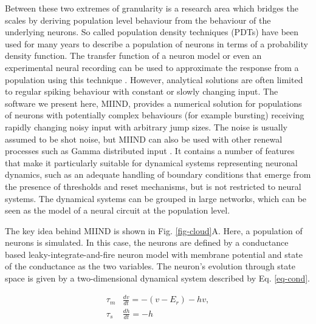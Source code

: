 \documentclass[utf8]{frontiersSCNS} %
\begin{document}
Between these two extremes of granularity is a research area which bridges the scales by deriving population level behaviour from the behaviour of the underlying neurons. So called population density techniques (PDTs) have been used for many years \citep{knight1972dynamics,knight1996dynamical,omurtag2000} to describe a population of neurons in terms of a probability density function. The transfer function of a neuron model or even an experimental neural recording can be used to approximate the response from a population using this technique \citep{wilson1972excitatory,el2009master,carlu2020mean}. However, analytical solutions are often limited to regular spiking behaviour with constant or slowly changing input. The software we present here, MIIND, provides a numerical solution for populations of neurons with potentially complex behaviours (for example bursting) receiving rapidly changing noisy input with arbitrary jump sizes. The noise is usually assumed to be shot noise, but MIIND can also be used with other renewal processes such as Gamma distributed input \citep{lai2017population}. 
It contains a number of features that make it particularly suitable for dynamical systems representing neuronal dynamics, such as an adequate handling of boundary conditions that emerge from the presence of thresholds and reset mechanisms, but is not restricted to neural systems. The dynamical systems can be grouped in large networks, which can be seen as the model of a neural circuit at the population level.

The key idea behind MIIND is shown in Fig. \ref{fig-cloud}A. Here, a population of neurons is simulated. In this case, the neurons are defined by a conductance based leaky-integrate-and-fire neuron model with membrane potential and state of the conductance as the two variables. The neuron's evolution through state space is given by a two-dimensional dynamical system described by Eq. \ref{eq-cond}. 

\begin{equation}
\begin{aligned}
\tau_m &\frac{dv}{dt} = -(v - E_r) - hv, \\
\tau_s &\frac{dh}{dt} = -h
\label{eq-cond}
\end{aligned}
\end{equation}
\end{document}

